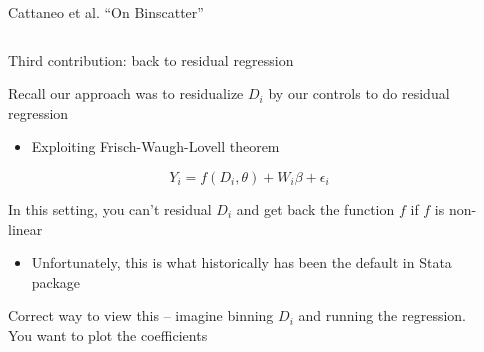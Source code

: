 \documentclass[notes,11pt, aspectratio=169]{beamer}
\newenvironment{wideitemize}{\itemize\addtolength{\itemsep}{10pt}}{\enditemize}
\begin{document}
\begin{frame}{Cattaneo et al. ``On Binscatter''}
  \begin{columns}[T] %
    \begin{column}{.5\textwidth}
      \begin{wideitemize}
      \item Third contribution: back to residual regression
      \item Recall our approach was to residualize $D_{i}$ by our
        controls to do residual regression
        \begin{itemize}
        \item Exploiting Frisch-Waugh-Lovell theorem
        \end{itemize}
        $$ Y_{i} = f(D_{i},\theta) + W_{i}\beta + \epsilon_{i}$$
      \item In this setting, you can't residual $D_{i}$ and get back
        the function $f$ if $f$ is non-linear
        \begin{itemize}
        \item Unfortunately, this is what historically has been the default in Stata package
        \end{itemize}
      \item Correct way to view this -- imagine binning $D_{i}$ and
        running the regression. You want to plot the coefficients
  \end{wideitemize}
  \end{column}%
  \hfill%
  \begin{column}{.5\textwidth}
  \end{column}
\end{columns}
\end{frame}
\end{document}

